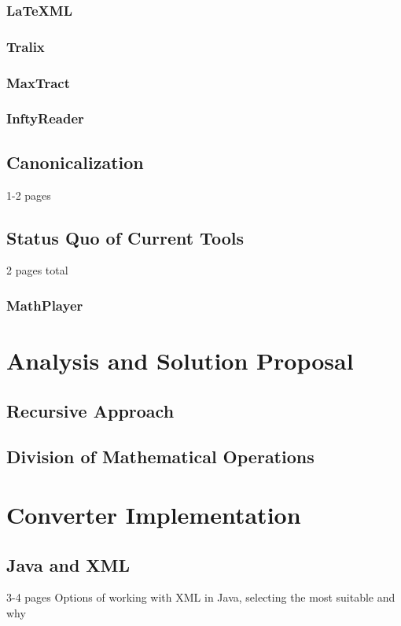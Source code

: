 \documentclass[11pt,oneside,final]{fithesis2}
\begin{document}
\subsection{\LaTeX ML}

\subsection{Tralix}

\subsection{MaxTract}

\subsection{InftyReader}

\section{Canonicalization}
1-2 pages
\section{Status Quo of Current Tools}
2 pages total
\subsection{MathPlayer}

\chapter{Analysis and Solution Proposal}

\section{Recursive Approach}
\section{Division of Mathematical Operations}

\chapter{Converter Implementation}
\section{Java and XML}
3-4 pages Options of working with XML in Java, selecting the most suitable and why
\end{document}
